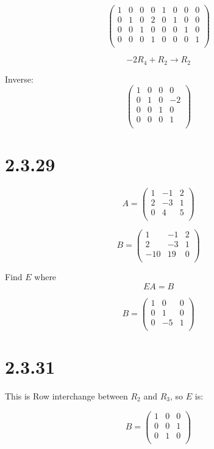 \documentclass{article}
\begin{document}
\[
	\left(
		\begin{array}{cccc|cccc}
			1&	0&	0&	0&	1&	0&	0&	0\\
			0&	1&	0&	2&	0&	1&	0&	0\\
			0&	0&	1&	0&	0&	0&	1&	0\\
			0&	0&	0&	1&	0&	0&	0&	1\\
		\end{array}
	\right)
\]

\[	-2R_4 + R_2 \rightarrow R_2		\]

Inverse:
\[
	\left(
		\begin{array}{cccc}
			1&	0&	0&	0\\
			0&	1&	0&	-2\\
			0&	0&	1&	0\\
			0&	0&	0&	1\\
		\end{array}
	\right)
\]

\newpage

\section*{2.3.29}
\[
	A=\left(
		\begin{array}{ccc}
			1&	-1&	2\\
			2&	-3&	1\\
			0&	4&	5\\
		\end{array}
	\right)
\]

\[
	B=\left(
		\begin{array}{ccc}
			1&	-1&	2\\
			2&	-3&	1\\
			-10&	19&	0\\
		\end{array}
	\right)
\]

Find $E$ where \[EA=B\]

\[
	B=\left(
		\begin{array}{ccc}
			1&	0&	0\\
			0&	1&	0\\
			0&	-5&	1\\
		\end{array}
	\right)
\]
\newpage

\section*{2.3.31}
This is Row interchange between $R_{2}$ and $R_{3}$, so $E$ is:

\[
	B=\left(
		\begin{array}{ccc}
			1&	0&	0\\
			0&	0&	1\\
			0&	1&	0\\
		\end{array}
	\right)
\]
\newpage
\end{document}
